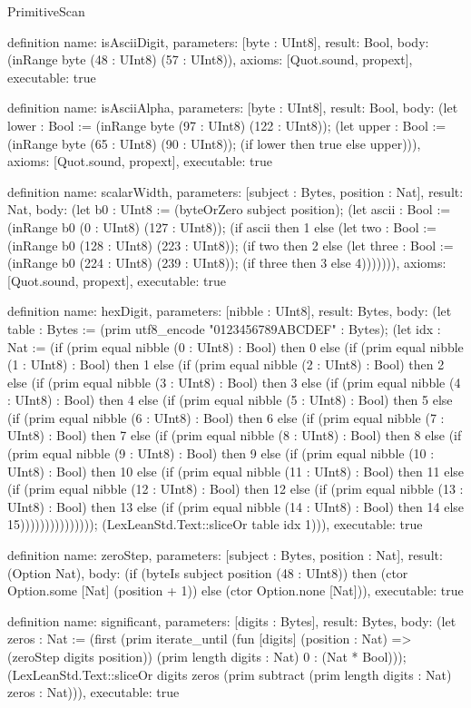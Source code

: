 \begin{lexlean}{PrimitiveScan}
\begin{semanticmodule}
definition{
  name: isAsciiDigit,
  parameters: [byte : UInt8],
  result: Bool,
  body: (inRange byte (48 : UInt8) (57 : UInt8)),
  axioms: [Quot.sound, propext],
  executable: true
}

definition{
  name: isAsciiAlpha,
  parameters: [byte : UInt8],
  result: Bool,
  body: (let lower : Bool := (inRange byte (97 : UInt8) (122 : UInt8)); (let upper : Bool := (inRange byte (65 : UInt8) (90 : UInt8)); (if lower then true else upper))),
  axioms: [Quot.sound, propext],
  executable: true
}

definition{
  name: scalarWidth,
  parameters: [subject : Bytes, position : Nat],
  result: Nat,
  body: (let b0 : UInt8 := (byteOrZero subject position); (let ascii : Bool := (inRange b0 (0 : UInt8) (127 : UInt8)); (if ascii then 1 else (let two : Bool := (inRange b0 (128 : UInt8) (223 : UInt8)); (if two then 2 else (let three : Bool := (inRange b0 (224 : UInt8) (239 : UInt8)); (if three then 3 else 4))))))),
  axioms: [Quot.sound, propext],
  executable: true
}

definition{
  name: hexDigit,
  parameters: [nibble : UInt8],
  result: Bytes,
  body: (let table : Bytes := (prim utf8_encode "0123456789ABCDEF" : Bytes); (let idx : Nat := (if (prim equal nibble (0 : UInt8) : Bool) then 0 else (if (prim equal nibble (1 : UInt8) : Bool) then 1 else (if (prim equal nibble (2 : UInt8) : Bool) then 2 else (if (prim equal nibble (3 : UInt8) : Bool) then 3 else (if (prim equal nibble (4 : UInt8) : Bool) then 4 else (if (prim equal nibble (5 : UInt8) : Bool) then 5 else (if (prim equal nibble (6 : UInt8) : Bool) then 6 else (if (prim equal nibble (7 : UInt8) : Bool) then 7 else (if (prim equal nibble (8 : UInt8) : Bool) then 8 else (if (prim equal nibble (9 : UInt8) : Bool) then 9 else (if (prim equal nibble (10 : UInt8) : Bool) then 10 else (if (prim equal nibble (11 : UInt8) : Bool) then 11 else (if (prim equal nibble (12 : UInt8) : Bool) then 12 else (if (prim equal nibble (13 : UInt8) : Bool) then 13 else (if (prim equal nibble (14 : UInt8) : Bool) then 14 else 15))))))))))))))); (LexLeanStd.Text::sliceOr table idx 1))),
  executable: true
}

definition{
  name: zeroStep,
  parameters: [subject : Bytes, position : Nat],
  result: (Option Nat),
  body: (if (byteIs subject position (48 : UInt8)) then (ctor Option.some [Nat] (position + 1)) else (ctor Option.none [Nat])),
  executable: true
}

definition{
  name: significant,
  parameters: [digits : Bytes],
  result: Bytes,
  body: (let zeros : Nat := (first (prim iterate_until (fun [digits] (position : Nat) => (zeroStep digits position)) (prim length digits : Nat) 0 : (Nat * Bool))); (LexLeanStd.Text::sliceOr digits zeros (prim subtract (prim length digits : Nat) zeros : Nat))),
  executable: true
}


\end{semanticmodule}
\end{lexlean}
